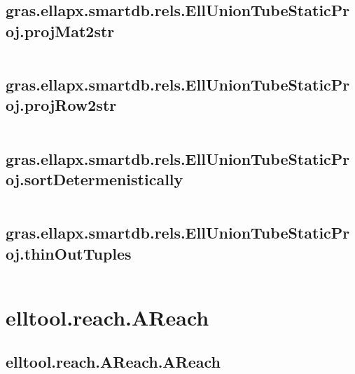 \subsection{\texorpdfstring{gras.ellapx.smartdb.rels.EllUnionTubeStaticProj.projMat2str}{projMat2str}}\label{method:gras.ellapx.smartdb.rels.EllUnionTubeStaticProj.projMat2str}
\begin{verbatim}

\end{verbatim}
\subsection{\texorpdfstring{gras.ellapx.smartdb.rels.EllUnionTubeStaticProj.projRow2str}{projRow2str}}\label{method:gras.ellapx.smartdb.rels.EllUnionTubeStaticProj.projRow2str}
\begin{verbatim}

\end{verbatim}
\subsection{\texorpdfstring{gras.ellapx.smartdb.rels.EllUnionTubeStaticProj.sortDetermenistically}{sortDetermenistically}}\label{method:gras.ellapx.smartdb.rels.EllUnionTubeStaticProj.sortDetermenistically}
\begin{verbatim}

\end{verbatim}
\subsection{\texorpdfstring{gras.ellapx.smartdb.rels.EllUnionTubeStaticProj.thinOutTuples}{thinOutTuples}}\label{method:gras.ellapx.smartdb.rels.EllUnionTubeStaticProj.thinOutTuples}
\begin{verbatim}

\end{verbatim}
\section{elltool.reach.AReach}\label{secClassDescr:elltool.reach.AReach}
\subsection{\texorpdfstring{elltool.reach.AReach.AReach}{AReach}}\label{method:elltool.reach.AReach.AReach}
\begin{verbatim}

\end{verbatim}
